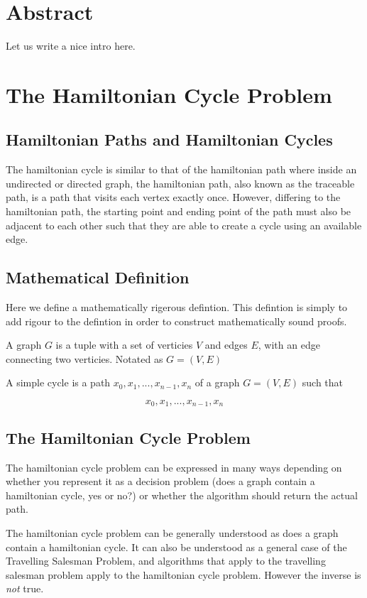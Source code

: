 \section{Abstract}

Let us write a nice intro here.

\section{The Hamiltonian Cycle Problem}

\subsection{Hamiltonian Paths and Hamiltonian Cycles}

The hamiltonian cycle is similar to that of the hamiltonian path where inside an
undirected or directed graph, the hamiltonian path, also known as the traceable
path, is a path that visits each vertex exactly once. However, differing to the
hamiltonian path, the starting point and ending point of the path must also be
adjacent to each other such that they are able to create a cycle using an
available edge. 

\subsection{Mathematical Definition}

Here we define a mathematically rigerous defintion\cite{Ros07}. This defintion
is simply to add rigour to the defintion in order to construct mathematically
sound proofs.

\begin{definition}[Graph]
    A graph $G$ is a tuple with a set of verticies $V$ and edges $E$, with an
    edge connecting two verticies. Notated as $G = (V, E)$
\end{definition}

\begin{definition}
    A simple cycle is a path $x_0, x_1, ..., x_{n-1}, x_n$ of a graph
    $G = (V, E)$ such that 
\end{definition}


\begin{equation}
    x_0, x_1, ..., x_{n-1}, x_n
\end{equation}

\subsection{The Hamiltonian Cycle Problem}

The hamiltonian cycle problem can be expressed in many ways depending on whether
you represent it as a decision problem (does a graph contain a hamiltonian
cycle, yes or no?) or whether the algorithm should return the actual path.

The hamiltonian cycle problem can be generally understood as does a graph
contain a hamiltonian cycle. It can also be understood as a general case of the
Travelling Salesman Problem, and algorithms that apply to the travelling
salesman problem apply to the hamiltonian cycle problem. However the inverse is
\emph{not} true.

\printbibliography


